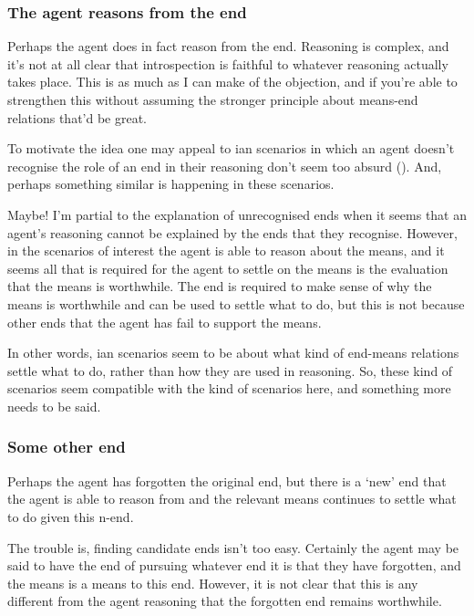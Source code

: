 \documentclass[10pt]{article}
\newcommand{\hozlinedash}[0]{%
  \noindent\hdashrule[0.5ex][c]{\textwidth}{.1pt}{2.5pt}
}
\begin{document}
\hozlinedash

\subsubsection*{The agent reasons from the end}
\label{sec:agent-reasons-from}

Perhaps the agent does in fact reason from the end.
Reasoning is complex, and it's not at all clear that introspection is faithful to whatever reasoning actually takes place.
This is as much as I can make of the objection, and if you're able to strengthen this without assuming the stronger principle about means-end relations that'd be great.

To motivate the idea one may appeal to \citeauthor{Freud:1960aa}ian scenarios in which an agent doesn't recognise the role of an end in their reasoning don't seem too absurd (\cite[cf.][]{Velleman:2000aa}).
And, perhaps something similar is happening in these scenarios.

Maybe!
I'm partial to the explanation of unrecognised ends when it seems that an agent's reasoning cannot be explained by the ends that they recognise.
However, in the scenarios of interest the agent is able to reason about the means, and it seems all that is required for the agent to settle on the means is the evaluation that the means is worthwhile.
The end is required to make sense of why the means is worthwhile and can be used to settle what to do, but this is not because other ends that the agent has fail to support the means.

In other words, \citeauthor{Freud:1960aa}ian scenarios seem to be about what kind of end-means relations settle what to do, rather than how they are used in reasoning.
So, these kind of scenarios seem compatible with the kind of scenarios here, and something more needs to be said.

\hozlinedash

\subsubsection*{Some other end}
\label{sec:some-other-end}

Perhaps the agent has forgotten the original end, but there is a `new' end that the agent is able to reason from and the relevant means continues to settle what to do given this n-end.

The trouble is, finding candidate ends isn't too easy.
Certainly the agent may be said to have the end of pursuing whatever end it is that they have forgotten, and the means is a means to this end.
However, it is not clear that this is any different from the agent reasoning that the forgotten end remains worthwhile.
\end{document}
